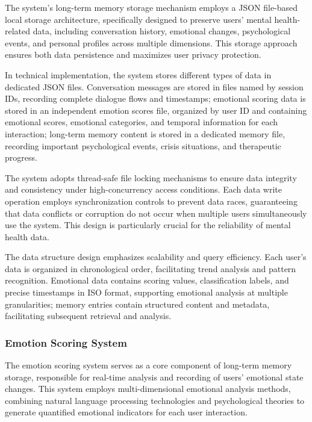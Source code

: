 The system's long-term memory storage mechanism employs a JSON file-based local storage architecture, specifically designed to preserve users' mental health-related data, including conversation history, emotional changes, psychological events, and personal profiles across multiple dimensions. This storage approach ensures both data persistence and maximizes user privacy protection.

In technical implementation, the system stores different types of data in dedicated JSON files. Conversation messages are stored in files named by session IDs, recording complete dialogue flows and timestamps; emotional scoring data is stored in an independent emotion scores file, organized by user ID and containing emotional scores, emotional categories, and temporal information for each interaction; long-term memory content is stored in a dedicated memory file, recording important psychological events, crisis situations, and therapeutic progress.

The system adopts thread-safe file locking mechanisms to ensure data integrity and consistency under high-concurrency access conditions. Each data write operation employs synchronization controls to prevent data races, guaranteeing that data conflicts or corruption do not occur when multiple users simultaneously use the system. This design is particularly crucial for the reliability of mental health data.

The data structure design emphasizes scalability and query efficiency. Each user's data is organized in chronological order, facilitating trend analysis and pattern recognition. Emotional data contains scoring values, classification labels, and precise timestamps in ISO format, supporting emotional analysis at multiple granularities; memory entries contain structured content and metadata, facilitating subsequent retrieval and analysis.

\subsubsection{Emotion Scoring System}

The emotion scoring system serves as a core component of long-term memory storage, responsible for real-time analysis and recording of users' emotional state changes. This system employs multi-dimensional emotional analysis methods, combining natural language processing technologies and psychological theories to generate quantified emotional indicators for each user interaction.

